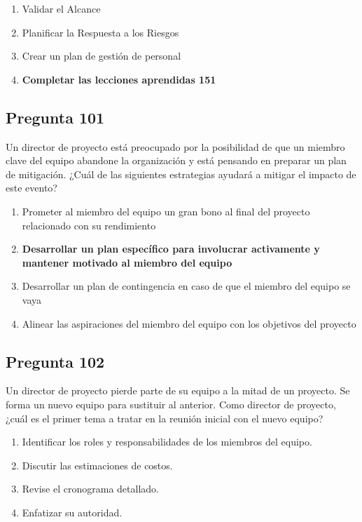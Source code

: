 \documentclass[11pt,a4paper]{article}
\begin{document}
\begin{enumerate}[label=\alph*)]
  \item Validar el Alcance
  \item Planificar la Respuesta a los Riesgos
  \item Crear un plan de gestión de personal
  \item \textbf{Completar las lecciones aprendidas 151}
\end{enumerate}

\subsection*{Pregunta 101}
Un director de proyecto está preocupado por la posibilidad de que un miembro clave del equipo abandone la organización y está pensando en preparar un plan de mitigación. ¿Cuál de las siguientes estrategias ayudará a mitigar el impacto de este evento?

\begin{enumerate}[label=\alph*)]
  \item Prometer al miembro del equipo un gran bono al final del proyecto relacionado con su rendimiento
  \item \textbf{Desarrollar un plan específico para involucrar activamente y mantener motivado al miembro del equipo}
  \item Desarrollar un plan de contingencia en caso de que el miembro del equipo se vaya
  \item Alinear las aspiraciones del miembro del equipo con los objetivos del proyecto
\end{enumerate}

\subsection*{Pregunta 102}
Un director de proyecto pierde parte de su equipo a la mitad de un proyecto. Se forma un nuevo equipo para sustituir al anterior. Como director de proyecto, ¿cuál es el primer tema a tratar en la reunión inicial con el nuevo equipo?

\begin{enumerate}[label=\alph*)]
  \item Identificar los roles y responsabilidades de los miembros del equipo.
  \item Discutir las estimaciones de costos.
  \item Revise el cronograma detallado.
  \item Enfatizar su autoridad.
\end{enumerate}
\end{document}
